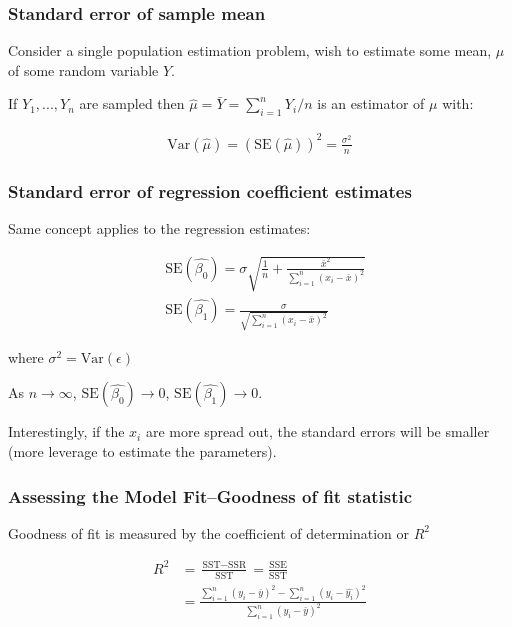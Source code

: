 \subsubsection{Standard error of sample mean}

\indent

Consider a single population estimation problem, wish to estimate some mean, $\mu$ of some random variable $Y$.

If $Y_1,...,Y_n$ are sampled then $\hat{\mu} = \bar{Y}=\sum_{i=1}^{n}Y_i/n$ is an estimator of $\mu$ with:

\begin{align*}
    \text{Var}(\hat{\mu})=(\text{SE}(\hat{\mu}))^2 = \frac{\sigma^2}{n}
\end{align*}

\subsubsection{Standard error of regression coefficient estimates}

\indent 

Same concept applies to the regression estimates:

\begin{align*}
    & \text{SE}(\widehat{\beta_0}) = \sigma\sqrt{\frac{1}{n}+\frac{\bar{x}^2}{\sum_{i=1}^{n}(x_i-\bar{x})^2}}\\
    & \text{SE}(\widehat{\beta_1})= \frac{\sigma}{\sqrt{\sum_{i=1}^{n}(x_i-\bar{x})^2}}
\end{align*}

where $\sigma ^2 = \text{Var}(\epsilon)$

As $n\xrightarrow[]{}\infty$, $\text{SE}(\widehat{\beta_0})\xrightarrow{}0$, $\text{SE}(\widehat{\beta_1})\xrightarrow{}0$.

Interestingly, if the $x_i$ are more spread out, the standard errors will be smaller (more leverage to estimate the parameters).

\subsubsection{Assessing the Model Fit–Goodness of fit statistic}

\indent 

Goodness of fit is measured by the coefficient of determination or $R^2$

\begin{align*}
    R^2 &= \frac{\text{SST} - \text{SSR}}{\text{SST}} = \frac{\text{SSE}}{\text{SST}}\\
     & = \frac{\sum_{i=1}^n(y_i - \bar{y})^2-\sum_{i=1}^{n}(y_i - \hat{y_i})^2}{\sum_{i=1}^n(y_i-\bar{y})^2}
\end{align*}

